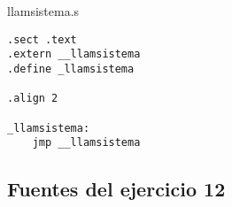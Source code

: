 llamsistema.s

\begin{verbatim}
.sect .text
.extern __llamsistema
.define _llamsistema

.align 2

_llamsistema:
	jmp __llamsistema
\end{verbatim}

\subsection{Fuentes del ejercicio 12}















